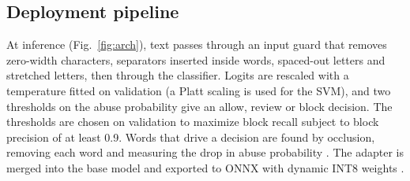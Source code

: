 \documentclass[conference]{IEEEtran}
\begin{document}
\subsection{Deployment pipeline}
At inference (Fig.~\ref{fig:arch}), text passes through an input guard that removes zero-width characters, separators inserted inside words, spaced-out letters and stretched letters, then through the classifier. Logits are rescaled with a temperature fitted on validation \cite{guo2017calibration} (a Platt scaling \cite{platt1999} is used for the SVM), and two thresholds on the abuse probability give an allow, review or block decision. The thresholds are chosen on validation to maximize block recall subject to block precision of at least 0.9. Words that drive a decision are found by occlusion, removing each word and measuring the drop in abuse probability \cite{zeiler2014}. The adapter is merged into the base model and exported to ONNX with dynamic INT8 weights \cite{jacob2018}.
\end{document}
